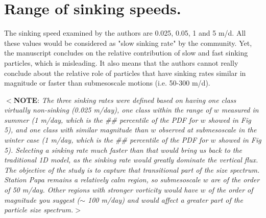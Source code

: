 \documentclass[12pt,letter]{article}
\newcommand{\note}[1]{\color{red}$<$\textbf{NOTE}: \textit{#1}$>$\color{black}}
\begin{document}
\section*{Range of sinking speeds.}
The sinking speed examined by the authors are 0.025, 0.05, 1 and 5 m/d. All these values would be considered as "slow sinking rate" by the community. Yet, the manuscript concludes on the relative contribution of slow and fast sinking particles, which is misleading. It also means that the authors cannot really conclude about the relative role of particles that have sinking rates similar in magnitude or faster than submesoscale motions (i.e. 50-300 m/d).

\note{The three sinking rates were defined based on having one class virtually non-sinking (0.025 m/day), one class within the range of $w$ measured in summer (1 m/day, which is the \#\# percentile of the PDF for $w$ showed in Fig 5), and one class with similar magnitude than $w$ observed at submesoscale in the winter case (1 m/day, which is the \#\# percentile of the PDF for $w$ showed in Fig 5). Selecting a sinking rate much faster than that would bring us back to the traditional 1D model, as the sinking rate would greatly dominate the vertical flux. The objective of the study is to capture that transitional part of the size spectrum. Station Papa remains a relatively calm region, so submesoscale $w$ are of the order of 50 m/day. Other regions with stronger vorticity would have $w$ of the order of magnitude you suggest ($\sim$ 100 m/day) and would affect a greater part of the particle size spectrum.}
\end{document}
